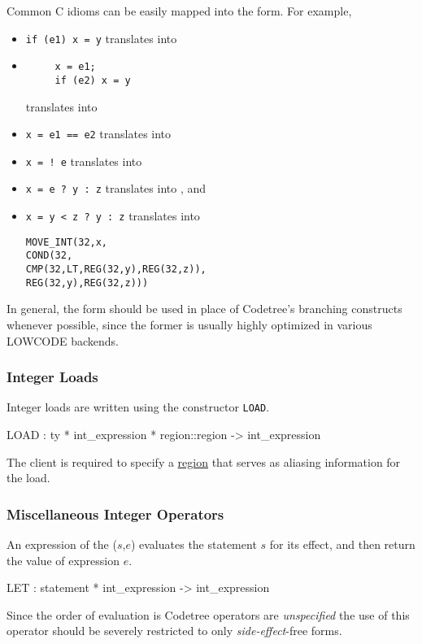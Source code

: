 Common C idioms can be easily mapped into the  form. For example,
\begin{itemize}
  \item \verb|if (e1) x = y| translates into
  \item
   \begin{verbatim}
     x = e1; 
     if (e2) x = y
   \end{verbatim}
    translates into 
  \item \verb|x = e1 == e2| translates into
  \item \verb|x = ! e| translates into
  \item \verb|x = e ? y : z| translates into
   , and
  \item \verb|x = y < z ? y : z| translates into
   \begin{alltt}
     MOVE_INT(32,x,
         COND(32,
            CMP(32,LT,REG(32,y),REG(32,z)),
               REG(32,y),REG(32,z)))
   \end{alltt} 
\end{itemize}

In general, the  form should be used in place of Codetree's branching
constructs whenever possible, since the former is usually highly 
optimized in various LOWCODE backends. 

\subsubsection{Integer Loads}

Integer loads are written using the constructor \verb|LOAD|.
\begin{SML}
   LOAD  : ty * int_expression * region::region -> int_expression
\end{SML}
The client is required to specify a \href{regions.html}{region} that
serves as aliasing information for the load.  

\subsubsection{Miscellaneous Integer Operators}

An expression of the ($s$,$e$) evaluates the statement $s$ for
its effect, and then return the value of expression $e$.
\begin{SML}
  LET  : statement * int_expression -> int_expression
\end{SML}
Since the order of evaluation is Codetree operators are 
\emph{unspecified}
the use of this operator should be severely restricted to only 
\emph{side-effect}-free forms.

